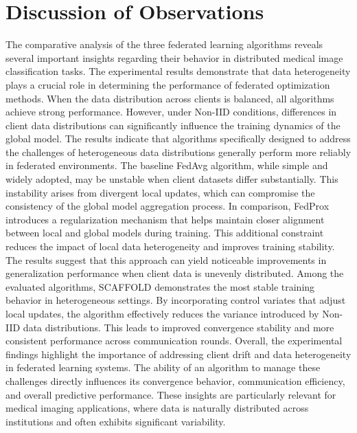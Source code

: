\documentclass[12pt]{book}
\begin{document}
\section{Discussion of Observations}
The comparative analysis of the three federated learning algorithms reveals several important insights regarding their behavior in distributed medical image classification tasks. The experimental results demonstrate that data heterogeneity plays a crucial role in determining the performance of federated optimization methods. When the data distribution across clients is balanced, all algorithms achieve strong performance. However, under Non-IID conditions, differences in client data distributions can significantly influence the training dynamics of the global model.
The results indicate that algorithms specifically designed to address the challenges of heterogeneous data distributions generally perform more reliably in federated environments. The baseline FedAvg algorithm, while simple and widely adopted, may be unstable when client datasets differ substantially. This instability arises from divergent local updates, which can compromise the consistency of the global model aggregation process.
In comparison, FedProx introduces a regularization mechanism that helps maintain closer alignment between local and global models during training. This additional constraint reduces the impact of local data heterogeneity and improves training stability. The results suggest that this approach can yield noticeable improvements in generalization performance when client data is unevenly distributed.
Among the evaluated algorithms, SCAFFOLD demonstrates the most stable training behavior in heterogeneous settings. By incorporating control variates that adjust local updates, the algorithm effectively reduces the variance introduced by Non-IID data distributions. This leads to improved convergence stability and more consistent performance across communication rounds.
Overall, the experimental findings highlight the importance of addressing client drift and data heterogeneity in federated learning systems. The ability of an algorithm to manage these challenges directly influences its convergence behavior, communication efficiency, and overall predictive performance. These insights are particularly relevant for medical imaging applications, where data is naturally distributed across institutions and often exhibits significant variability.
\end{document}
